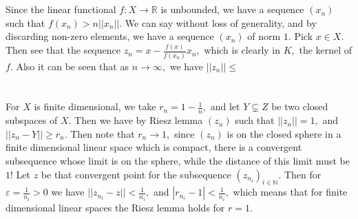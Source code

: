 \documentclass{article}
\begin{document}
\section{} %
Since the linear functional $f:X \rightarrow \mathbb{R}$ is unbounded, we have a sequence $(x_n)$ such that $f(x_n) > n ||x_n||.$ We can say without loss of 
generality, and by discarding non-zero elements, we have a sequence $(x_n)$ of norm $1.$ Pick $x \in X.$ Then see that the sequence 
$z_n=x-\frac{f(x)}{f(x_n)}x_n,$ which is clearly in $K,$ the kernel of $f.$ Also it can be seen that as $n \to \infty,$ we have $||z_n|| \leq$
\section{} %

For $X$ is finite dimensional, we take $r_n=1-\frac{1}{n},$ and let $Y \subsetneq Z$ be two closed subspaces of $X.$ Then we have by Riesz lemma  $(z_n)$ 
such that $||z_n||=1,$ and $||z_n-Y|| \geq r_n.$ Then note that $r_n \to 1,$ since $(z_n)$ is on the closed sphere in a finite dimensional linear space 
which is compact, there is a convergent subsequence whose limit is on the sphere, while the distance of this limit must be $1!$ Let $z$ be that convergent 
point for the subsequence $(z_{n_i})_{i \in \mathbb{N}}$. Then for $\varepsilon= \frac{1}{n_i}>0$ we have $||z_{n_i}-z||< \frac{1}{n_i},$ and $|r_{n_i}- 1|< 
\frac{1}{n_i},$ which means that for finite dimensional linear spaces the Riesz lemma holds for $r=1.$


   
\end{document}
